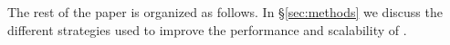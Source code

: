 The rest of the paper is organized as follows. In \S\ref{sec:methods} we discuss the different strategies used to improve the performance and scalability of \mm. 

